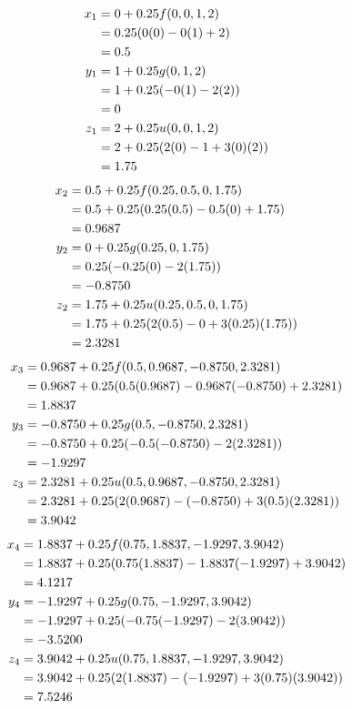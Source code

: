 		\begin{align}
			x_{1} &= 0 + 0.25f(0,0,1,2)& \notag \\
			&= 0.25(0(0) - 0(1) + 2)& \notag \\
			&= 0.5& \\
			y_{1} &= 1 + 0.25g(0,1,2)& \notag \\
			&= 1 + 0.25(-0(1) - 2(2))& \notag \\
			&= 0& \\
			z_{1} &= 2 + 0.25u(0,0,1,2)& \notag \\
			&= 2 + 0.25(2(0) - 1 + 3(0)(2))& \notag \\
			&= 1.75&
		\end{align}
		\begin{align}
			x_{2} &= 0.5 + 0.25f(0.25,0.5,0,1.75)& \notag \\
			&= 0.5 + 0.25(0.25(0.5) - 0.5(0) + 1.75)& \notag \\
			&= 0.9687& \\
			y_{2} &= 0 + 0.25g(0.25,0,1.75)& \notag \\
			&= 0.25(-0.25(0) - 2(1.75))& \notag \\
			&= -0.8750& \\
			z_{2} &= 1.75 + 0.25u(0.25,0.5,0,1.75)& \notag \\
			&= 1.75 + 0.25(2(0.5) - 0 + 3(0.25)(1.75))& \notag \\
			&= 2.3281&
		\end{align}
		\begin{align}
			x_{3} &= 0.9687 + 0.25f(0.5,0.9687,-0.8750,2.3281)& \notag \\
			&= 0.9687 + 0.25(0.5(0.9687) - 0.9687(-0.8750) + 2.3281)& \notag \\
			&= 1.8837& \\
			y_{3} &= -0.8750 + 0.25g(0.5,-0.8750,2.3281)& \notag \\
			&= -0.8750 + 0.25(-0.5(-0.8750) - 2(2.3281))& \notag \\
			&= -1.9297& \\
			z_{3} &= 2.3281 + 0.25u(0.5,0.9687,-0.8750,2.3281)& \notag \\
			&= 2.3281 + 0.25(2(0.9687) - (-0.8750) + 3(0.5)(2.3281))& \notag \\
			&= 3.9042&
		\end{align}
		\begin{align}
			x_{4} &= 1.8837 + 0.25f(0.75,1.8837,-1.9297,3.9042)& \notag \\
			&= 1.8837 + 0.25(0.75(1.8837) - 1.8837(-1.9297) + 3.9042)& \notag \\
			&= 4.1217& \\
			y_{4} &= -1.9297 + 0.25g(0.75,-1.9297,3.9042)& \notag \\
			&= -1.9297 + 0.25(-0.75(-1.9297) - 2(3.9042))& \notag \\
			&= -3.5200& \\
			z_{4} &= 3.9042 + 0.25u(0.75,1.8837,-1.9297,3.9042)& \notag \\
			&= 3.9042 + 0.25(2(1.8837) - (-1.9297) + 3(0.75)(3.9042))& \notag \\
			&= 7.5246&
		\end{align}


